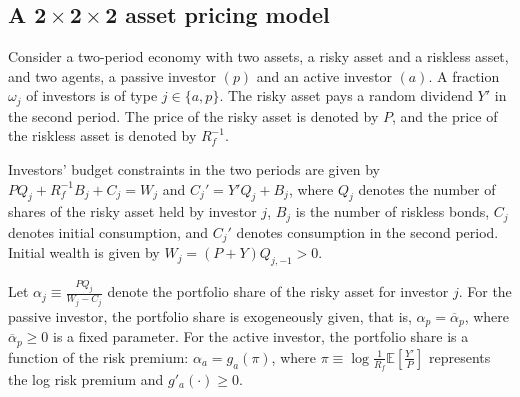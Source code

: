 \subsection{A \texorpdfstring{$\boldsymbol{2\times 2 \times 2}$}{Lg} asset pricing model }

Consider a two-period economy with two assets, a risky asset and a riskless asset, and two agents, a passive investor $(p)$ and an active investor $(a)$. 
A fraction $\omega_j$ of investors is of type $j \in \{a,p\}$.
The risky asset pays a random dividend $Y'$ in the second period. 
The price of the risky asset is denoted by  $P$, and the price of the riskless asset is denoted by $R_f^{-1}$.

Investors' budget constraints in the two periods are given by $ P Q_j + R_f^{-1} B_j + C_j = W_j$ and 
$C_j' = Y' Q_j + B_j$, 
where $Q_j$ denotes the number of shares of the risky asset held by investor $j$, $B_j$ is the number of riskless bonds, $C_j$ denotes initial consumption, and $C_j'$ denotes consumption in the second period. 
Initial wealth is given by $W_j = (P+Y) Q_{j,-1} > 0$.

Let $\alpha_j \equiv \frac{P Q_j}{W_j - C_j}$ denote the portfolio share of the risky asset for investor $j$. 
For the passive investor, the portfolio share is exogeneously given, that is, $\alpha_p = \overline{\alpha}_p$, where $\overline{\alpha}_p \geq 0$ is a fixed parameter.
For the active investor, the portfolio share is a function of the risk premium: $    \alpha_a = g_{a}(\pi)$, where $\pi \equiv \log \frac{1}{R_f}\mathbb{E}[\frac{Y'}{P}]$ represents the log risk premium and $g'_a(\cdot) \geq 0$.

